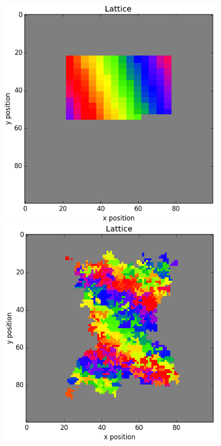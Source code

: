 \documentclass[12pt]{article}
\begin{document}
\begin{figure}[h]
	\centering
	\includegraphics[scale=0.52]{img/nebula_0}
	\includegraphics[scale=0.52]{img/nebula_5000}

\end{figure}
\end{document}
